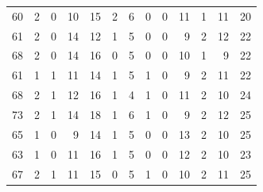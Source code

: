 \begin{table}[]
\begin{tabular}{rrrrrrrrrrrrr}
	60 & 2 & 0 & 10 & 15 & 2 & 6 & 0 & 0 & 11 & 1 & 11 & 20 \\
	61 & 2 & 0 & 14 & 12 & 1 & 5 & 0 & 0 & 9 & 2 & 12 & 22 \\
	68 & 2 & 0 & 14 & 16 & 0 & 5 & 0 & 0 & 10 & 1 & 9 & 22 \\
	61 & 1 & 1 & 11 & 14 & 1 & 5 & 1 & 0 & 9 & 2 & 11 & 22 \\
	68 & 2 & 1 & 12 & 16 & 1 & 4 & 1 & 0 & 11 & 2 & 10 & 24 \\
	73 & 2 & 1 & 14 & 18 & 1 & 6 & 1 & 0 & 9 & 2 & 12 & 25 \\
	65 & 1 & 0 & 9 & 14 & 1 & 5 & 0 & 0 & 13 & 2 & 10 & 25 \\
	63 & 1 & 0 & 11 & 16 & 1 & 5 & 0 & 0 & 12 & 2 & 10 & 23 \\
	67 & 2 & 1 & 11 & 15 & 0 & 5 & 1 & 0 & 10 & 2 & 11 & 25
	\end{tabular}
\end{table}

